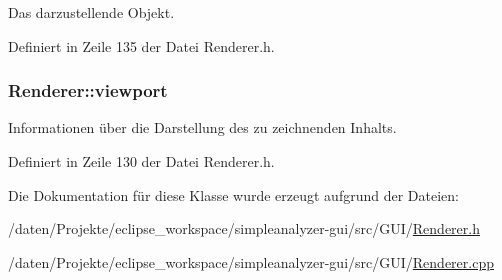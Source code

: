 Das darzustellende Objekt. 



Definiert in Zeile 135 der Datei Renderer.\-h.

\hypertarget{classRenderer_a4428a5ef0ceaf4de5c9991a40990994d}{
\subsubsection[{viewport}]{ Renderer\-::viewport\hspace{0.3cm}{\ttfamily [private]}}}\label{classRenderer_a4428a5ef0ceaf4de5c9991a40990994d}


Informationen über die Darstellung des zu zeichnenden Inhalts. 



Definiert in Zeile 130 der Datei Renderer.\-h.



Die Dokumentation für diese Klasse wurde erzeugt aufgrund der Dateien\-:\begin{DoxyCompactItemize}
\item 
/daten/\-Projekte/eclipse\-\_\-workspace/simpleanalyzer-\/gui/src/\-G\-U\-I/\hyperlink{Renderer_8h}{Renderer.\-h}\item 
/daten/\-Projekte/eclipse\-\_\-workspace/simpleanalyzer-\/gui/src/\-G\-U\-I/\hyperlink{Renderer_8cpp}{Renderer.\-cpp}\end{DoxyCompactItemize}
